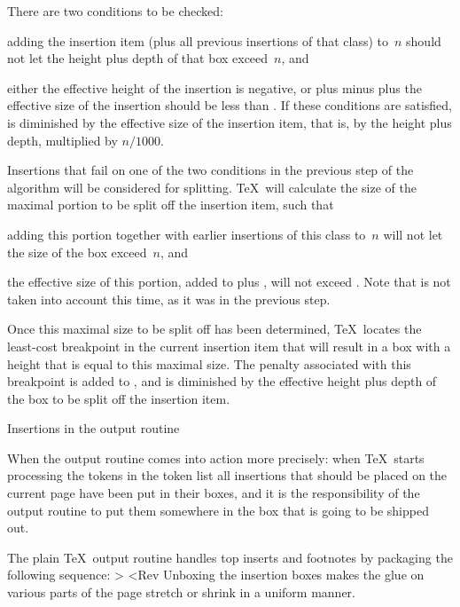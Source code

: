   There are two conditions to be checked:\itemlist\item
  adding the insertion item (plus all previous insertions of that class)
  to $\,n$ should not let
  the height plus depth of that box exceed $\,n$, and
  \item either the effective height of the insertion is negative, or
   plus  minus 
  plus the effective size of the insertion should be less than
  .\itemliststop
  If these conditions are satisfied,  is diminished
  by the effective size of the insertion item, that is,
  by the height plus depth, multiplied by $n/1000$.

\item Insertions that fail on one of the two conditions in the
  previous step of the algorithm will be considered for splitting.
  \TeX\ will calculate the size of the maximal portion to 
  be split off the insertion item, such that
  \enumerate\item adding this portion
  together with earlier insertions of this class to $\,n$
  will not let the size of the box exceed $\,n$,
  and \item the effective size of this portion,
  added to  plus , will not
  exceed . Note that  is not taken
  into account this time, as it was in the previous step.
  \>
  
  Once this maximal size to be split off has been determined,
  \TeX\ locates the least-cost breakpoint in the current 
  insertion item that will result in a box with a  height
  that is equal to this maximal size. The penalty associated
  with this breakpoint is added to ,
  and  is diminished by the effective height plus
  depth of the box to be split off the insertion item.

\enumeratestop



\point Insertions in the output routine

When the output routine comes into action \ldash more precisely:
when \TeX\ starts processing the tokens in the 
token list \rdash  all insertions that should be placed on the
current page have been put in their boxes, and
it is the responsibility of the output routine
to put them somewhere in the box that is going to be shipped out.

\example The plain \TeX\ output routine
handles top inserts and footnotes by packaging the following
sequence:
\Ver>\ifvoid\topins \else \unvbox\topins \fi
\pagebody
\ifvoid\footins \else \unvbox\footins \fi<Rev
Unboxing the insertion boxes makes the glue on various parts
of the page stretch or shrink in a uniform manner.
\>

